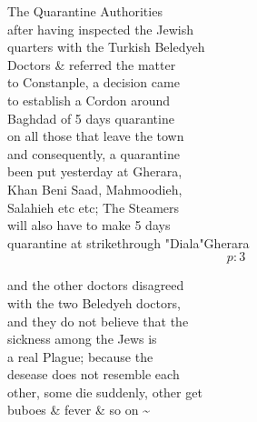 \documentclass{report}
\begin{document}
	\par{
 	The Quarantine Authorities\ \\after having inspected the Jewish\ \\quarters with the Turkish Beledyeh\ \\Doctors \& referred the matter\ \\to Constanple, a decision came\ \\to establish a Cordon around\ \\Baghdad of 5 days quarantine\ \\on all those that leave the town\ \\and consequently, a quarantine\ \\been put yesterday at Gherara,\ \\Khan Beni Saad, Mahmoodieh,\ \\Salahieh etc etc; The Steamers\ \\will also have to make 5 days\ \\quarantine at \lbrack strikethrough "Diala"\rbrack Gherara\ \\
  \[p: 3 \]

	}



	\par{
 	and the other doctors disagreed\ \\with the two Beledyeh doctors,\ \\and they do not believe that the\ \\sickness among the Jews is\ \\a real Plague; because the\ \\desease does not resemble each\ \\other, some die suddenly, other get\ \\buboes \& fever \& so on \~{}\ \\
	}
\end{document}
